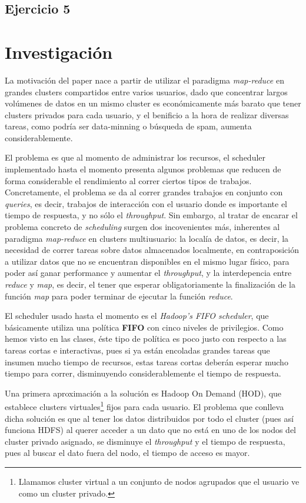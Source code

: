 \documentclass[a4paper]{article}
\begin{document}
\subsection{Ejercicio 5}


\newpage
\section{Investigación}

La motivación del paper nace a partir de utilizar el paradigma
\textit{map-reduce} en grandes clusters compartidos entre varios usuarios, dado
que concentrar largos volúmenes de datos en un mismo cluster es económicamente
más barato que tener clusters privados para cada usuario, y el benificio a la
hora de realizar diversas tareas, como podría ser data-minning o búsqueda de
spam, aumenta considerablemente.

El problema es que al momento de administrar los recursos, el scheduler
implementado hasta el momento presenta algunos problemas que reducen de forma
considerable el rendimiento al correr ciertos tipos de trabajos. Concretamente,
el problema se da al correr grandes trabajos en conjunto con \textit{queries},
es decir, trabajos de interacción con el usuario donde es importante el tiempo
de respuesta, y no sólo el \textit{throughput}. Sin embargo, al tratar de
encarar el problema concreto de \textit{scheduling} surgen dos incovenientes
más, inherentes al paradigma \textit{map-reduce} en clusters multiusuario: la
localía de datos, es decir, la necesidad de correr tareas sobre datos
almacenados localmente, en contraposición a utilizar datos que no se encuentran
disponibles en el mismo lugar físico, para poder así ganar performance y
aumentar el \textit{throughput}, y la interdepencia entre \textit{reduce} y
\textit{map}, es decir, el tener que esperar obligatoriamente la finalización
de la función \textit{map} para poder terminar de ejecutar la función
\textit{reduce}.

El scheduler usado hasta el momento es el \textit{Hadoop's FIFO scheduler}, que
básicamente utiliza una política \textbf{FIFO} con cinco niveles de
privilegios.  Como hemos visto en las clases, éste tipo de política es poco
justo con respecto a las tareas cortas e interactivas, pues si ya están
encoladas grandes tareas que insumen mucho tiempo de recursos, estas tareas
cortas deberán esperar mucho tiempo para correr, disminuyendo considerablemente
el tiempo de respuesta.

Una primera aproximación a la solución es Hadoop On Demand (HOD), que establece
clusters virtuales\footnote{Llamamos cluster virtual a un conjunto de nodos
agrupados que el usuario ve como un cluster privado.} fijos para cada usuario.
El problema que conlleva dicha solución es que al tener los datos distribuidos
por todo el cluster (pues así funciona HDFS) al querer acceder a un dato que no
está en uno de los nodos del cluster privado asignado, se disminuye el
\textit{throughput} y el tiempo de respuesta, pues al buscar el dato fuera del
nodo, el tiempo de acceso es mayor.
\end{document}
